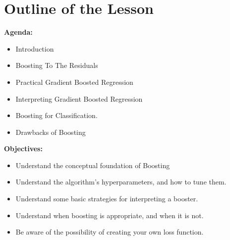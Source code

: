 \section{Outline of the Lesson}
%
\begin{frame}
\textbf{Agenda:}
 
  \begin{itemize}
    \item Introduction
    \item Boosting To The Residuals
    \item Practical Gradient Boosted Regression
    \item Interpreting Gradient Boosted Regression
    \item Boosting for Classification.
    \item Drawbacks of Boosting
  \end{itemize}

\end{frame}
%
\begin{frame}
\textbf{Objectives:}

  \begin{itemize}
    \item Understand the conceptual foundation of Boosting
    \item Understand the algorithm's hyperparameters, and how to tune them.
    \item Understand some basic strategies for interpreting a booster.
    \item Understand when boosting is appropriate, and when it is not.
    \item Be aware of the possibility of creating your own loss function.
  \end{itemize}
  
\end{frame}